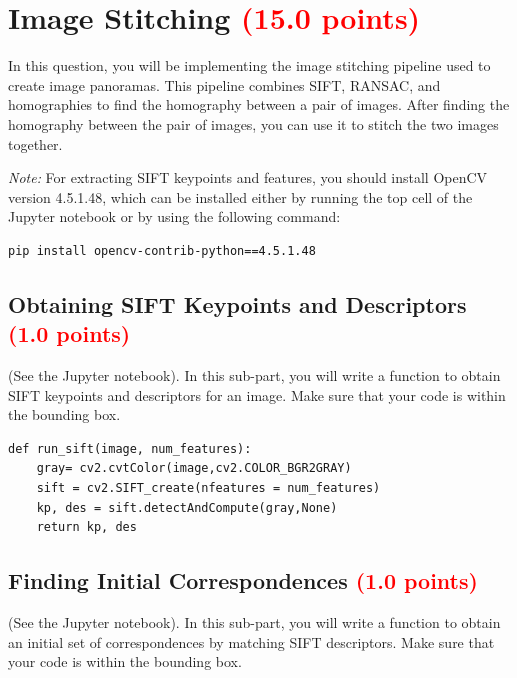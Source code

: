\documentclass[answers]{exam}
\newcommand{\mypoints}[1]{\textcolor{red}{(#1 points)}}
\begin{document}
\newpage

\section{Image Stitching \mypoints{15.0}}
In this question, you will be implementing the image stitching pipeline used to create image panoramas. This pipeline combines SIFT, RANSAC, and homographies to find the homography between a pair of images. After finding the homography between the pair of images, you can use it to stitch the two images together.

\emph{Note:} For extracting SIFT keypoints and features, you should install OpenCV version 4.5.1.48, which can be installed either by running the top cell of the Jupyter notebook or by using the following command: 
\begin{verbatim}
pip install opencv-contrib-python==4.5.1.48
\end{verbatim}

\subsection{Obtaining SIFT Keypoints and Descriptors \mypoints{1.0}}
(See the Jupyter notebook). In this sub-part, you will write a function to obtain SIFT keypoints and descriptors for an image. Make sure that your code is within the bounding box.

\begin{solution}
\begin{verbatim}
def run_sift(image, num_features):
    gray= cv2.cvtColor(image,cv2.COLOR_BGR2GRAY)
    sift = cv2.SIFT_create(nfeatures = num_features)
    kp, des = sift.detectAndCompute(gray,None)
    return kp, des
\end{verbatim}
\end{solution}

\subsection{Finding Initial Correspondences \mypoints{1.0}}
(See the Jupyter notebook). In this sub-part, you will write a function to obtain an initial set of correspondences by matching SIFT descriptors. Make sure that your code is within the bounding box.
\end{document}
